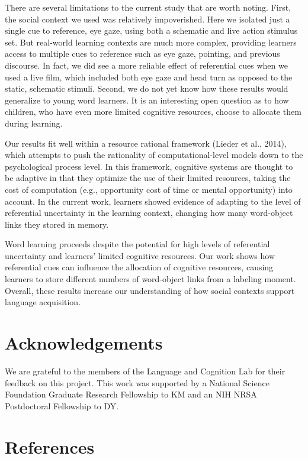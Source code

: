 \documentclass[12pt,]{article}
\begin{document}
There are several limitations to the current study that are worth
noting. First, the social context we used was relatively impoverished.
Here we isolated just a single cue to reference, eye gaze, using both a
schematic and live action stimulus set. But real-world learning contexts
are much more complex, providing learners access to multiple cues to
reference such as eye gaze, pointing, and previous discourse. In fact,
we did see a more reliable effect of referential cues when we used a
live film, which included both eye gaze and head turn as opposed to the
static, schematic stimuli. Second, we do not yet know how these results
would generalize to young word learners. It is an interesting open
question as to how children, who have even more limited cognitive
resources, choose to allocate them during learning.

Our results fit well within a resource rational framework (Lieder et
al., 2014), which attempts to push the rationality of
computational-level models down to the psychological process level. In
this framework, cognitive systems are thought to be adaptive in that
they optimize the use of their limited resources, taking the cost of
computation (e.g., opportunity cost of time or mental opportunity) into
account. In the current work, learners showed evidence of adapting to
the level of referential uncertainty in the learning context, changing
how many word-object links they stored in memory.

Word learning proceeds despite the potential for high levels of
referential uncertainty and learners' limited cognitive resources. Our
work shows how referential cues can influence the allocation of
cognitive resources, causing learners to store different numbers of
word-object links from a labeling moment. Overall, these results
increase our understanding of how social contexts support language
acquisition.

\section{Acknowledgements}\label{acknowledgements}

We are grateful to the members of the Language and Cognition Lab for
their feedback on this project. This work was supported by a National
Science Foundation Graduate Research Fellowship to KM and an NIH NRSA
Postdoctoral Fellowship to DY.

\newpage

\section*{References}\label{references}
\end{document}

